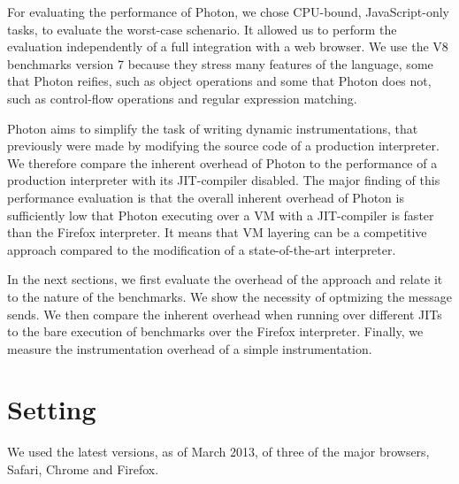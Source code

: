 For evaluating the performance of Photon, we chose CPU-bound, JavaScript-only
tasks, to evaluate the worst-case schenario. It allowed us to perform the
evaluation independently of a full integration with a web browser. We use the
V8 benchmarks version 7 because they stress many features of the language, some that
Photon reifies, such as object operations and some that Photon does not, such
as control-flow operations and regular expression matching.

Photon aims to simplify the task of writing dynamic instrumentations, that
previously were made by modifying the source code of a production interpreter.
We therefore compare the inherent overhead of Photon to the performance of a
production interpreter with its JIT-compiler disabled. The major finding of
this performance evaluation is that the overall inherent overhead of Photon is
sufficiently low that Photon executing over a VM with a JIT-compiler is faster
than the Firefox interpreter.  It means that VM layering can be a competitive
approach compared to the modification of a state-of-the-art interpreter.

In the next sections, we first evaluate the overhead of the approach and relate
it to the nature of the benchmarks. We show the necessity of optmizing the
message sends. We then compare the inherent overhead when running over
different JITs to the bare execution of benchmarks over the Firefox
interpreter. Finally, we measure the instrumentation overhead of a simple
instrumentation.

\section{Setting}

We used the latest versions, as of March 2013, of three of the major browsers,
Safari, Chrome and Firefox.

